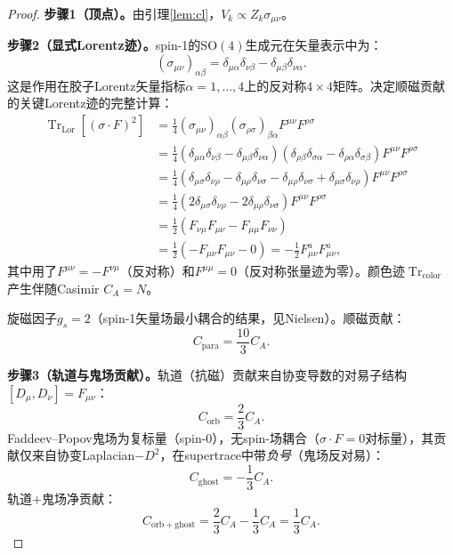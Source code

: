 \documentclass[12pt,a4paper]{article}
\theoremstyle{plain}
\theoremstyle{definition}\newtheorem{definition}[theorem]{定义}
\theoremstyle{remark}\newtheorem{remark}[theorem]{注记}
\begin{document}
\begin{proof}
\textbf{步骤1（顶点）。}由引理\ref{lem:cl}，$V_k\propto Z_k\sigma_{\mu\nu}$。

\textbf{步骤2（显式Lorentz迹）。}spin-1的$\mathrm{SO}(4)$生成元在矢量表示中为：
\begin{equation}\label{eq:sigma}
(\sigma_{\mu\nu})_{\alpha\beta}=\delta_{\mu\alpha}\delta_{\nu\beta}-\delta_{\mu\beta}\delta_{\nu\alpha}.
\end{equation}
这是作用在胶子Lorentz矢量指标$\alpha=1,\ldots,4$上的反对称$4\times 4$矩阵。决定顺磁贡献的关键Lorentz迹的完整计算：
\begin{align}
\operatorname{Tr}_{\mathrm{Lor}}[(\sigma\cdot F)^2]
&= \tfrac{1}{4}(\sigma_{\mu\nu})_{\alpha\beta}(\sigma_{\rho\sigma})_{\beta\alpha}F^{\mu\nu}F^{\rho\sigma}\label{eq:lt1}\\
&= \tfrac{1}{4}(\delta_{\mu\alpha}\delta_{\nu\beta}-\delta_{\mu\beta}\delta_{\nu\alpha})(\delta_{\rho\beta}\delta_{\sigma\alpha}-\delta_{\rho\alpha}\delta_{\sigma\beta})F^{\mu\nu}F^{\rho\sigma}\label{eq:lt2}\\
&= \tfrac{1}{4}(\delta_{\mu\sigma}\delta_{\nu\rho}-\delta_{\mu\rho}\delta_{\nu\sigma}-\delta_{\mu\rho}\delta_{\nu\sigma}+\delta_{\mu\sigma}\delta_{\nu\rho})F^{\mu\nu}F^{\rho\sigma}\label{eq:lt3}\\
&= \tfrac{1}{4}(2\delta_{\mu\sigma}\delta_{\nu\rho}-2\delta_{\mu\rho}\delta_{\nu\sigma})F^{\mu\nu}F^{\rho\sigma}\label{eq:lt4}\\
&= \tfrac{1}{2}(F_{\nu\mu}F_{\mu\nu}-F_{\mu\mu}F_{\nu\nu})\label{eq:lt5}\\
&= \tfrac{1}{2}(-F_{\mu\nu}F_{\mu\nu}-0) = -\tfrac{1}{2}F_{\mu\nu}^aF_{\mu\nu}^a,\label{eq:lt6}
\end{align}
其中用了$F^{\mu\nu}=-F^{\nu\mu}$（反对称）和$F^{\mu\mu}=0$（反对称张量迹为零）。颜色迹$\operatorname{Tr}_{\mathrm{color}}$产生伴随Casimir $C_A=N$。

旋磁因子$g_s=2$（spin-1矢量场最小耦合的结果，见Nielsen\cite{Nielsen1981}）。顺磁贡献：
\begin{equation}\label{eq:Cpara}
C_{\mathrm{para}} = \frac{10}{3}C_A.
\end{equation}

\textbf{步骤3（轨道与鬼场贡献）。}轨道（抗磁）贡献来自协变导数的对易子结构$[D_\mu,D_\nu]=F_{\mu\nu}$：
\begin{equation}
C_{\mathrm{orb}} = \frac{2}{3}C_A.
\end{equation}
Faddeev--Popov鬼场为复标量（spin-0），无spin-场耦合（$\sigma\cdot F=0$对标量），其贡献仅来自协变Laplacian$-D^2$，在supertrace中带\emph{负号}（鬼场反对易）：
\begin{equation}
C_{\mathrm{ghost}} = -\frac{1}{3}C_A.
\end{equation}
轨道$+$鬼场净贡献：
\begin{equation}\label{eq:Corbghost}
C_{\mathrm{orb+ghost}} = \frac{2}{3}C_A - \frac{1}{3}C_A = \frac{1}{3}C_A.
\end{equation}


\end{proof}
\end{document}
